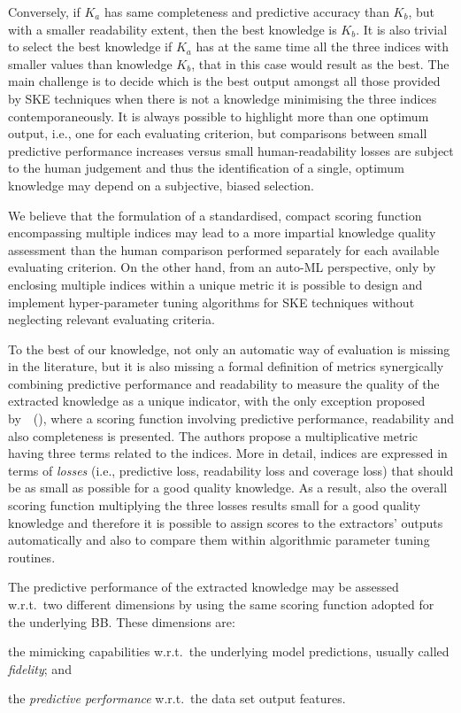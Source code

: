 \documentclass{article}
\newcommand{\citet}[1]{\citeauthor{#1}~(\citeyear{#1})}
\newenvironment{inlinelist}{\begin{enumerate*}[label=\emph{(\roman{*})}]}{\end{enumerate*}}
\begin{document}
%
Conversely, if $K_a$ has same completeness and predictive accuracy than $K_b$, but with a smaller readability extent, then the best knowledge is $K_b$.
%
It is also trivial to select the best knowledge if $K_a$ has at the same time all the three indices with smaller values than knowledge $K_b$, that in this case would result as the best.
%
The main challenge is to decide which is the best output amongst all those provided by SKE techniques when there is not a knowledge minimising the three indices contemporaneously.
%
It is always possible to highlight more than one optimum output, i.e., one for each evaluating criterion, but comparisons between small predictive performance increases versus small human-readability losses are subject to the human judgement and thus the identification of a single, optimum knowledge may depend on a subjective, biased selection.

We believe that the formulation of a standardised, compact scoring function encompassing multiple indices may lead to a more impartial knowledge quality assessment than the human comparison performed separately for each available evaluating criterion.
%
On the other hand, from an auto-ML perspective, only by enclosing multiple indices within a unique metric it is possible to design and implement hyper-parameter tuning algorithms for SKE techniques without neglecting relevant evaluating criteria.

To the best of our knowledge, not only an automatic way of evaluation is missing in the literature, but it is also missing a formal definition of metrics synergically combining predictive performance and readability to measure the quality of the extracted knowledge as a unique indicator, with the only exception proposed by~\citet{skemetrics-aaai2023}, where a scoring function involving predictive performance, readability and also completeness is presented.
%
The authors propose a multiplicative metric having three terms related to the indices.
%
More in detail, indices are expressed in terms of \emph{losses} (i.e., predictive loss, readability loss and coverage loss) that should be as small as possible for a good quality knowledge.
%
As a result, also the overall scoring function multiplying the three losses results small for a good quality knowledge and therefore it is possible to assign scores to the extractors' outputs automatically and also to compare them within algorithmic parameter tuning routines.

The predictive performance of the extracted knowledge may be assessed w.r.t.\ two different dimensions by using the same scoring function adopted for the underlying BB.
%
These dimensions are:
%
\begin{inlinelist}
	\item the mimicking capabilities w.r.t.\ the underlying model predictions, usually called \emph{fidelity}; and
	\item the \emph{predictive performance} w.r.t.\ the data set output features.
\end{inlinelist}
\end{document}
